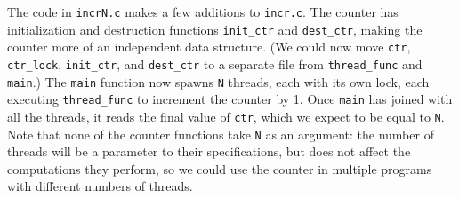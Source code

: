 \documentclass[11pt]{article}
\begin{document}
The code in \texttt{incrN.c} makes a few additions to \texttt{incr.c}. The counter has initialization and destruction functions \texttt{init\_ctr} and \texttt{dest\_ctr}, making the counter more of an independent data structure. (We could now move \texttt{ctr}, \texttt{ctr\_lock}, \texttt{init\_ctr}, and \texttt{dest\_ctr} to a separate file from \texttt{thread\_func} and \texttt{main}.) The \texttt{main} function now spawns \texttt{N} threads, each with its own lock, each executing \texttt{thread\_func} to increment the counter by 1. Once \texttt{main} has joined with all the threads, it reads the final value of \texttt{ctr}, which we expect to be equal to \texttt{N}. Note that none of the counter functions take \texttt{N} as an argument: the number of threads will be a parameter to their specifications, but does not affect the computations they perform, so we could use the counter in multiple programs with different numbers of threads.
\end{document}
